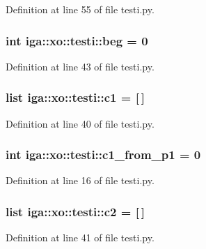 Definition at line 55 of file testi.py.
\subsubsection{\setlength{\rightskip}{0pt plus 5cm}int {\bf iga::xo::testi::beg} = 0\hspace{0.3cm}{\tt  [static]}}\label{namespaceiga_1_1xo_1_1testi_782599a939fef4d11b0ef9bd42701387}




Definition at line 43 of file testi.py.
\subsubsection{\setlength{\rightskip}{0pt plus 5cm}list {\bf iga::xo::testi::c1} = [$\,$]\hspace{0.3cm}{\tt  [static]}}\label{namespaceiga_1_1xo_1_1testi_31ac175da86aba76d486ef8da777a96f}




Definition at line 40 of file testi.py.
\subsubsection{\setlength{\rightskip}{0pt plus 5cm}int {\bf iga::xo::testi::c1\_\-from\_\-p1} = 0\hspace{0.3cm}{\tt  [static]}}\label{namespaceiga_1_1xo_1_1testi_7f99373e04655d18a023a137563a8e5c}




Definition at line 16 of file testi.py.
\subsubsection{\setlength{\rightskip}{0pt plus 5cm}list {\bf iga::xo::testi::c2} = [$\,$]\hspace{0.3cm}{\tt  [static]}}\label{namespaceiga_1_1xo_1_1testi_51b9eced49425f5d949a3446cb235f18}




Definition at line 41 of file testi.py.
